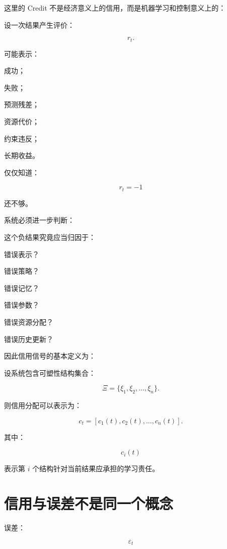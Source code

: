 这里的 Credit 不是经济意义上的信用，而是机器学习和控制意义上的：

\begin{statementbox}
\centering
{}
\end{statementbox}

设一次结果产生评价：

\[
r_t.
\]

可能表示：

成功；

失败；

预测残差；

资源代价；

约束违反；

长期收益。

仅仅知道：

\[
r_t=-1
\]

还不够。

系统必须进一步判断：

这个负结果究竟应当归因于：

错误表示？

错误策略？

错误记忆？

错误参数？

错误资源分配？

错误历史更新？

因此信用信号的基本定义为：

\begin{statementbox}
\centering
{}
\end{statementbox}

设系统包含可塑性结构集合：

\[
\Xi
=
\{
\xi_1,\xi_2,\ldots,\xi_n
\}.
\]

则信用分配可以表示为：

\[
\boxed{
c_t
=
[
c_1(t),
c_2(t),
\ldots,
c_n(t)
].
}
\]

其中：

\[
c_i(t)
\]

表示第 $i$ 个结构针对当前结果应承担的学习责任。

\section{信用与误差不是同一个概念}

误差：

\[
\varepsilon_t
\]

